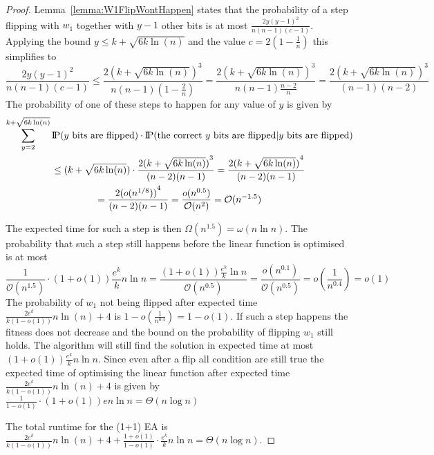 \begin{proof}
    Lemma~\ref{lemma:W1FlipWontHappen} states that the probability of a step flipping with $w_1$ together with $y-1$ other bits is at most $\frac{2y{(y-1)}^2}{n(n-1)(c-1)}$.
    Applying the bound $y\le k+\sqrt{6k\ln(n)}$ and the value $c=2(1-\frac{1}{n})$ this simplifies to
    \[
        \frac{2y{(y-1)}^2}{n(n-1)(c-1)}
        \le\frac{2{(k+\sqrt{6k\ln(n)})}^3}{n(n-1)(1-\frac{2}{n})}
        =\frac{2{(k+\sqrt{6k\ln(n)})}^3}{n(n-1)\frac{n-2}{n}}
        =\frac{2{(k+\sqrt{6k\ln(n)})}^3}{(n-1)(n-2)}
    \]
    The probability of one of these steps to happen for any value of $y$ is given by
    \begin{gather}
        \nonumber \sum_{y=2}^{k+\sqrt{6k\ln(n)}}{\text{I\kern-0.15em P}(y \text{ bits are flipped})\cdot\text{I\kern-0.15em P}(\text{the correct $y$ bits are flipped} | y \text{ bits are flipped})}\\
        \nonumber \le ({k+\sqrt{6k\ln(n)}})\cdot\frac{2{(k+\sqrt{6k\ln(n)})}^{3}}{(n-2)(n-1)}
        = \frac{2{(k+\sqrt{6k\ln(n)})}^{4}}{(n-2)(n-1)}\\ \nonumber
        = \frac{2{(o({n}^{1/8}))}^{4}}{(n-2)(n-1)}
        = \frac{o(n^{0.5})}{\mathcal{O}(n^{2})}
        = \mathcal{O}(n^{-1.5})
    \end{gather}

    The expected time for such a step is then $\Omega(n^{1.5})=\omega(n\ln n)$.
    The probability that such a step still happens before the linear function is optimised is at most
    \[
        \frac{1}{\mathcal{O}(n^{1.5})}\cdot(1+o(1))\frac{e^k}{k}n\ln n
        =\frac{(1+o(1))\frac{e^k}{k}\ln n}{\mathcal{O}(n^{0.5})}
        =\frac{o(n^{0.1})}{\mathcal{O}(n^{0.5})}
        =o(\frac{1}{n^{0.4}})=o(1)\]
    The probability of $w_1$ not being flipped after expected time $\frac{2e^k}{k(1-o(1))}n\ln(n)+4$ is \(1-o(\frac{1}{n^{0.4}})=1-o(1)\).
    If such a step happens the fitness does not decrease and the bound on the probability of flipping $w_1$ still holds.
    The algorithm will still find the solution in expected time at most $(1+o(1))\frac{e^k}{k}n\ln n$.
    Since even after a flip all condition are still true the expected time of optimising the linear function after expected time $\frac{2e^k}{k(1-o(1))}n\ln(n)+4$ is given by \(\frac{1}{1-o(1)}\cdot(1+o(1))en\ln n=\Theta(n\log{}n)\)

    The total runtime for the (1+1) EA is $\frac{2e^k}{k(1-o(1))}n\ln(n)+4 + \frac{1+o(1)}{1-o(1)}\cdot \frac{e^k}{k}n\ln n =\Theta(n\log{}n)$.

\end{proof}

